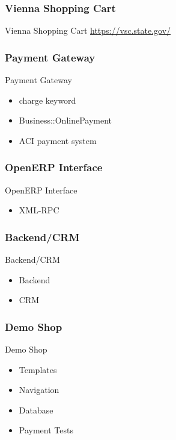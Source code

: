 \subsubsection{Vienna Shopping Cart}
\begin{frame}{Vienna Shopping Cart}
\url{https://vsc.state.gov/}
\end{frame}

\subsubsection{Payment Gateway}
\begin{frame}{Payment Gateway}
  \begin{itemize}
  \item charge keyword
  \item Business::OnlinePayment
  \item ACI payment system
  \end{itemize}
\end{frame}

\subsubsection{OpenERP Interface}
\begin{frame}{OpenERP Interface} 
  \begin{itemize}
  \item XML-RPC
  \end{itemize}
\end{frame}

\subsubsection{Backend/CRM}
\begin{frame}{Backend/CRM} 
  \begin{itemize}
  \item Backend
  \item CRM
  \end{itemize}
\end{frame}

\subsubsection{Demo Shop}
\begin{frame}{Demo Shop} 
  \begin{itemize}
  \item Templates
  \item Navigation
  \item Database
  \item Payment Tests
  \end{itemize}
\end{frame}


